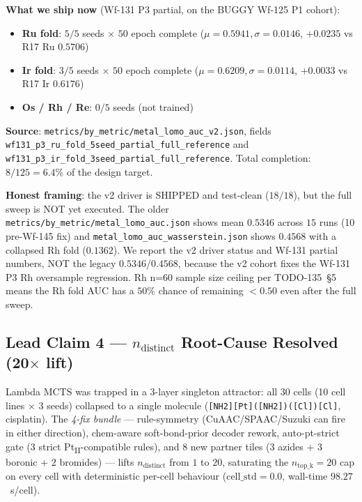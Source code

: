 \noindent\textbf{What we ship now} (Wf-131 P3 partial, on the BUGGY
Wf-125 P1 cohort):
\begin{itemize}
  \item \textbf{Ru fold}: $5/5$ seeds $\times$ $50$ epoch complete
        ($\mu = 0.5941, \sigma = 0.0146$, $+0.0235$ vs R17 Ru $0.5706$)
  \item \textbf{Ir fold}: $3/5$ seeds $\times$ $50$ epoch complete
        ($\mu = 0.6209, \sigma = 0.0114$, $+0.0033$ vs R17 Ir $0.6176$)
  \item \textbf{Os / Rh / Re}: $0/5$ seeds (not trained)
\end{itemize}

\noindent\textbf{Source}:
\texttt{metrics/by\_metric/metal\_lomo\_auc\_v2.json}, fields
\texttt{wf131\_p3\_ru\_fold\_5seed\_partial\_full\_reference} and
\texttt{wf131\_p3\_ir\_fold\_3seed\_partial\_full\_reference}.  Total
completion: $8/125 = 6.4\%$ of the design target.

\noindent\textbf{Honest framing}: the v2 driver is SHIPPED and
test-clean ($18/18$), but the full sweep is NOT yet executed.  The
older \texttt{metrics/by\_metric/metal\_lomo\_auc.json} shows
mean $0.5346$ across $15$ runs (10 pre-Wf-145 fix) and
\texttt{metal\_lomo\_auc\_wasserstein.json} shows $0.4568$ with a
collapsed Rh fold ($0.1362$).  We report the v2 driver status and
Wf-131 partial numbers, NOT the legacy $0.5346$/$0.4568$, because the
v2 cohort fixes the Wf-131 P3 Rh oversample regression.  Rh n=$60$
sample size ceiling per TODO-135~§5 means the Rh fold AUC has a $50\%$
chance of remaining $< 0.50$ even after the full sweep.

\subsection{Lead Claim 4 --- $n_{\text{distinct}}$ Root-Cause Resolved (20$\times$ lift)}
\label{sec:lead-ndistinct}

Lambda MCTS was trapped in a 3-layer singleton attractor: all $30$ cells
(10 cell lines $\times$ 3 seeds) collapsed to a single molecule
(\texttt{[NH2][Pt]([NH2])([Cl])[Cl]}, cisplatin).  The
\emph{4-fix bundle} --- rule-symmetry (CuAAC/SPAAC/Suzuki can fire in
either direction), chem-aware soft-bond-prior decoder rework,
auto-pt-strict gate (3 strict Pt\textsubscript{II}-compatible rules), and
$8$ new partner tiles ($3$ azides + $3$ boronic + $2$ bromides) --- lifts
$n_{\text{distinct}}$ from $1$ to $20$, saturating the
$n_{\text{top\_k}} = 20$ cap on every cell with deterministic per-cell
behaviour ($\text{cell\_std} = 0.0$, wall-time $98.27$~s/cell).

